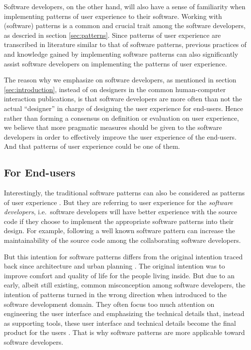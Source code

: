 \documentclass[a4paper,titlepage]{article}
\begin{document}
Software developers, on the other hand, will also have a sense of
familiarity when implementing patterns of user experience to their
software. Working with (software) patterns is a common and crucial
trait among the software developers, as descried in section
\ref{sec:patterns}. Since patterns of user experience are transcribed
in literature similar to that of software patterns, previous practices
of and knowledge gained by implementing software patterns can also
significantly assist software developers on implementing the patterns
of user experience.

The reason why we emphasize on software developers, as mentioned in
section \ref{sec:introduction}, instead of on designers in the common
human-computer interaction publications, is that software developers
are more often than not the actual ``designer'' in charge of designing
the user experience for end-users. Hence rather than forming a
consensus on definition or evaluation on user experience, we believe
that more pragmatic measures should be given to the software
developers in order to effectively improve the user experience of the
end-users. And that patterns of user experience could be one of them.

\subsection{For End-users}
Interestingly, the traditional software patterns can also be
considered as patterns of user experience \citep{pux:blackwell}. But
they are referring to user experience for the \textit{software
  developers}, i.e.\ software developers will have better experience
with the source code if they choose to implement the appropriate
software patterns into their design. For example, following a well
known software pattern can increase the maintainability of the source
code among the collaborating software developers.

But this intention for software patterns differs from the original
intention traced back since architecture and urban planning
\citep{timeless:alexander}. The original intention was to improve
comfort and quality of life for the people living inside. But due to
an early, albeit still existing, common misconception among software
developers, the intention of patterns turned in the wrong direction
when introduced to the software development domain. They often focus
too much attention on engineering the user interface and emphasizing
the technical details that, instead as supporting tools, these user
interface and technical details become the final product for the users
\citep{pux:blackwell}. That is why software patterns are more
applicable toward software developers.
\end{document}

